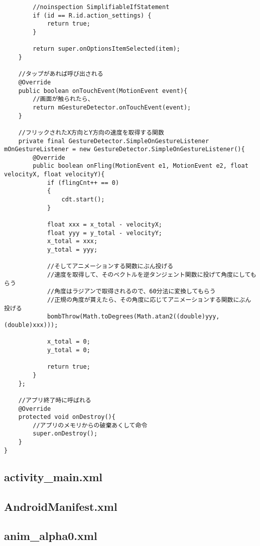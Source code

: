 \documentclass[11pt,a4j]{jarticle}
\begin{document}
\begin{verbatim}
        //noinspection SimplifiableIfStatement
        if (id == R.id.action_settings) {
            return true;
        }

        return super.onOptionsItemSelected(item);
    }
    
    //タップがあれば呼び出される
    @Override
    public boolean onTouchEvent(MotionEvent event){
        //画面が触られたら、
        return mGestureDetector.onTouchEvent(event);
    }

    //フリックされたX方向とY方向の速度を取得する関数
    private final GestureDetector.SimpleOnGestureListener mOnGestureListener = new GestureDetector.SimpleOnGestureListener(){
        @Override
        public boolean onFling(MotionEvent e1, MotionEvent e2, float velocityX, float velocityY){
            if (flingCnt++ == 0)
            {
                cdt.start();
            }

            float xxx = x_total - velocityX;
            float yyy = y_total - velocityY;
            x_total = xxx;
            y_total = yyy;

            //そしてアニメーションする関数にぶん投げる
            //速度を取得して、そのベクトルを逆タンジェント関数に投げて角度にしてもらう
            //角度はラジアンで取得されるので、60分法に変換してもらう
            //正規の角度が貰えたら、その角度に応じてアニメーションする関数にぶん投げる
            bombThrow(Math.toDegrees(Math.atan2((double)yyy, (double)xxx)));

            x_total = 0;
            y_total = 0;

            return true;
        }
    };

    //アプリ終了時に呼ばれる
    @Override
    protected void onDestroy(){
        //アプリのメモリからの破棄あくして命令
        super.onDestroy();
    }
}

	\end{verbatim}

\subsection{activity\_main.xml}
	
	\newpage
\subsection{AndroidManifest.xml}
	
	\newpage
\subsection{anim\_alpha0.xml}
	
	\newpage
\end{document}
